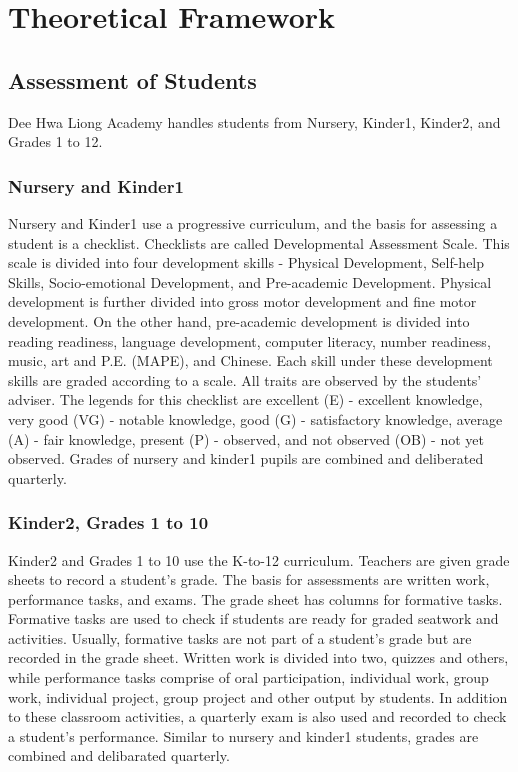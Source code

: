 \documentclass[11pt,a4paper,titlepage]{article}
\let\stdsection\section
\renewcommand\section{\newpage\stdsection}
\begin{document}
 

\section{Theoretical Framework}

\subsection{Assessment of Students}
Dee Hwa Liong Academy handles students from Nursery, Kinder1, Kinder2, and Grades 1 to 12.

\subsubsection{Nursery and Kinder1}
Nursery and Kinder1 use a progressive curriculum, and the basis for assessing a student is a checklist. Checklists are called Developmental Assessment Scale. This scale is divided into four development skills - Physical Development, Self-help Skills, Socio-emotional Development, and Pre-academic Development. Physical development is further divided into gross motor development and fine motor development. On the other hand, pre-academic development is divided into reading readiness, language development, computer literacy, number readiness, music, art and P.E. (MAPE), and Chinese. Each skill under these development skills are graded according to a scale. All traits are observed by the students' adviser. The legends for this checklist are excellent (E) - excellent knowledge, very good (VG) - notable knowledge, good (G) - satisfactory knowledge, average (A) - fair knowledge, present (P) - observed, and not observed (OB) - not yet observed. Grades of nursery and kinder1 pupils are combined and deliberated quarterly.

\subsubsection{Kinder2, Grades 1 to 10}
Kinder2 and Grades 1 to 10 use the K-to-12 curriculum. Teachers are given grade sheets to record a student's grade. The basis for assessments are written work, performance tasks, and exams. The grade sheet has columns for formative tasks. Formative tasks are used to check if students are ready for graded seatwork and activities. Usually, formative tasks are not part of a student's grade but are recorded in the grade sheet. Written work is divided into two, quizzes and others, while performance tasks comprise of oral participation, individual work, group work, individual project, group project and other output by students. In addition to these classroom activities, a quarterly exam is also used and recorded to check a student's performance. Similar to nursery and kinder1 students, grades are combined and delibarated quarterly.
\end{document}
